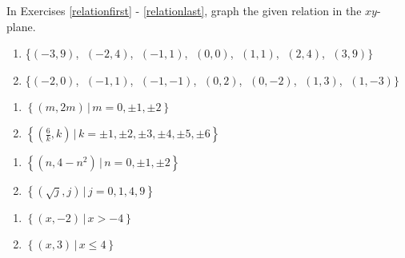 \documentclass{ximera}
\begin{document}
	\author{Stitz-Zeager}


\label{ExercisesforRelations}

In Exercises \ref{relationfirst} - \ref{relationlast}, graph the given relation in the $xy$-plane.

\smallskip


\begin{enumerate}

\item \{$(-3, 9)$, $\;(-2, 4)$, $\;(-1, 1)$, $\;(0, 0)$, $\;(1, 1)$, $\;(2, 4)$, $\;(3, 9)\}$ \label{relationfirst}
\item \{$(-2, 0)$, $\;(-1, 1)$, $\;(-1, -1)$, $\;(0, 2)$, $\;(0, -2)$, $\;(1, 3)$, $\;(1, -3)\}$

\setcounter{HW}{\value{enumi}}
\end{enumerate}


\begin{multicols}{2}
\begin{enumerate}
\setcounter{enumi}{\value{HW}}

\item  $\left\{ \left(m, 2m \right) \, | \, m = 0, \pm 1, \pm 2 \right\}$
\item  $\left\{ \left(\frac{6}{k}, k \right) \, | \, k = \pm 1, \pm 2, \pm 3, \pm 4, \pm 5, \pm 6 \right\}$

\setcounter{HW}{\value{enumi}}
\end{enumerate}
\end{multicols}


\begin{multicols}{2}
\begin{enumerate}
\setcounter{enumi}{\value{HW}}

\item  $\left\{ \left(n, 4 - n^2\right) \, | \, n = 0, \pm 1, \pm 2 \right\}$
\item  $\left\{ \left(\sqrt{j}, j \right) \, | \, j = 0, 1, 4, 9 \right\}$

\setcounter{HW}{\value{enumi}}
\end{enumerate}
\end{multicols}


\begin{multicols}{2}
\begin{enumerate}
\setcounter{enumi}{\value{HW}}

\item  $\left\{ \left(x, -2 \right) \, | \, x > -4 \right\}$
\item  $\left\{ \left(x, 3 \right) \, | \, x \leq 4 \right\}$

\setcounter{HW}{\value{enumi}}
\end{enumerate}
\end{multicols}
\end{document}
